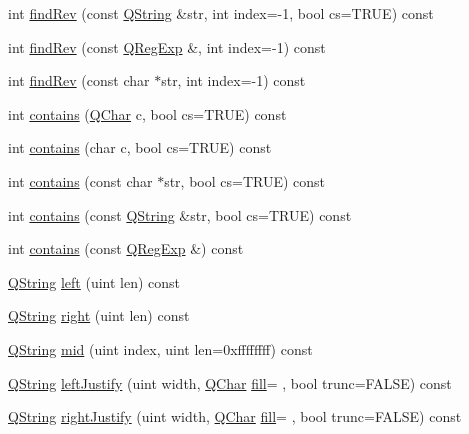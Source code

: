 \begin{DoxyCompactItemize}
\item 
int \mbox{\hyperlink{class_q_string_abd18b44d7313c0ef3160d69d1b936ad5}{find\+Rev}} (const \mbox{\hyperlink{class_q_string}{Q\+String}} \&str, int index=-\/1, bool cs=T\+R\+UE) const
\item 
int \mbox{\hyperlink{class_q_string_a678d778450575709d552d7be4316d68c}{find\+Rev}} (const \mbox{\hyperlink{class_q_reg_exp}{Q\+Reg\+Exp}} \&, int index=-\/1) const
\item 
int \mbox{\hyperlink{class_q_string_a1feec4e6b662ef6dee407ec85ffee9d9}{find\+Rev}} (const char $\ast$str, int index=-\/1) const
\item 
int \mbox{\hyperlink{class_q_string_addd0afccd10afee3a1b42ceaaf3206b8}{contains}} (\mbox{\hyperlink{class_q_char}{Q\+Char}} c, bool cs=T\+R\+UE) const
\item 
int \mbox{\hyperlink{class_q_string_adf600f28026a425717c0b06b73eb6647}{contains}} (char c, bool cs=T\+R\+UE) const
\item 
int \mbox{\hyperlink{class_q_string_aeee533389b8072c556a9d479fb27c01f}{contains}} (const char $\ast$str, bool cs=T\+R\+UE) const
\item 
int \mbox{\hyperlink{class_q_string_a587310c93b5f81eb250075f50f3210d2}{contains}} (const \mbox{\hyperlink{class_q_string}{Q\+String}} \&str, bool cs=T\+R\+UE) const
\item 
int \mbox{\hyperlink{class_q_string_af8e35ae76218246a857e68e105981726}{contains}} (const \mbox{\hyperlink{class_q_reg_exp}{Q\+Reg\+Exp}} \&) const
\item 
\mbox{\hyperlink{class_q_string}{Q\+String}} \mbox{\hyperlink{class_q_string_a02545407c8e65afbf6bd22324f9ed517}{left}} (uint len) const
\item 
\mbox{\hyperlink{class_q_string}{Q\+String}} \mbox{\hyperlink{class_q_string_aa77ad91688915fed22e4150b00b5fd92}{right}} (uint len) const
\item 
\mbox{\hyperlink{class_q_string}{Q\+String}} \mbox{\hyperlink{class_q_string_a1ef65644b1885a7003d5c2a8e88df479}{mid}} (uint index, uint len=0xffffffff) const
\item 
\mbox{\hyperlink{class_q_string}{Q\+String}} \mbox{\hyperlink{class_q_string_a5a4d00c06bb265d1d91100c816ce1ba2}{left\+Justify}} (uint width, \mbox{\hyperlink{class_q_char}{Q\+Char}} \mbox{\hyperlink{class_q_string_a261151b9ce7096b9af4a9588bb5d038a}{fill}}=\textquotesingle{} \textquotesingle{}, bool trunc=F\+A\+L\+SE) const
\item 
\mbox{\hyperlink{class_q_string}{Q\+String}} \mbox{\hyperlink{class_q_string_a77e73231263538edb5b62675471c5e78}{right\+Justify}} (uint width, \mbox{\hyperlink{class_q_char}{Q\+Char}} \mbox{\hyperlink{class_q_string_a261151b9ce7096b9af4a9588bb5d038a}{fill}}=\textquotesingle{} \textquotesingle{}, bool trunc=F\+A\+L\+SE) const

\end{DoxyCompactItemize}
